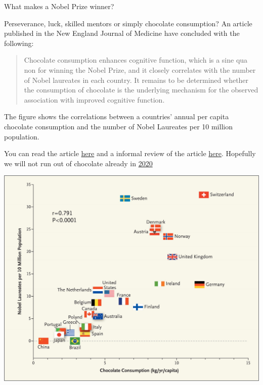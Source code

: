 \documentclass[ignorenonframetext,]{beamer}
\begin{document}
\begin{frame}

\begin{block}{What makes a Nobel Prize winner?}

Perseverance, luck, skilled mentors or simply chocolate consumption? An
article published in the New England Journal of Medicine have concluded
with the following:

\begin{quote}
Chocolate consumption enhances cognitive function, which is a sine qua
non for winning the Nobel Prize, and it closely correlates with the
number of Nobel laureates in each country. It remains to be determined
whether the consumption of chocolate is the underlying mechanism for the
observed association with improved cognitive function.
\end{quote}

The figure shows the correlations between a countries' annual per capita
chocolate consumption and the number of Nobel Laureates per 10 million
population.

You can read the article
\href{http://www.nejm.org/doi/full/10.1056/NEJMon1211064}{here} and a
informal review of the article
\href{https://blogs.scientificamerican.com/the-curious-wavefunction/chocolate-consumption-and-nobel-prizes-a-bizarre-juxtaposition-if-there-ever-was-one/}{here}.
Hopefully we will not run out of chocolate already in
\href{http://www.mirror.co.uk/news/world-news/chocolate-could-run-out-2020-2913505}{2020}

\end{block}

\end{frame}

\begin{frame}

\includegraphics{chocolate.jpeg}

\end{frame}
\end{document}
